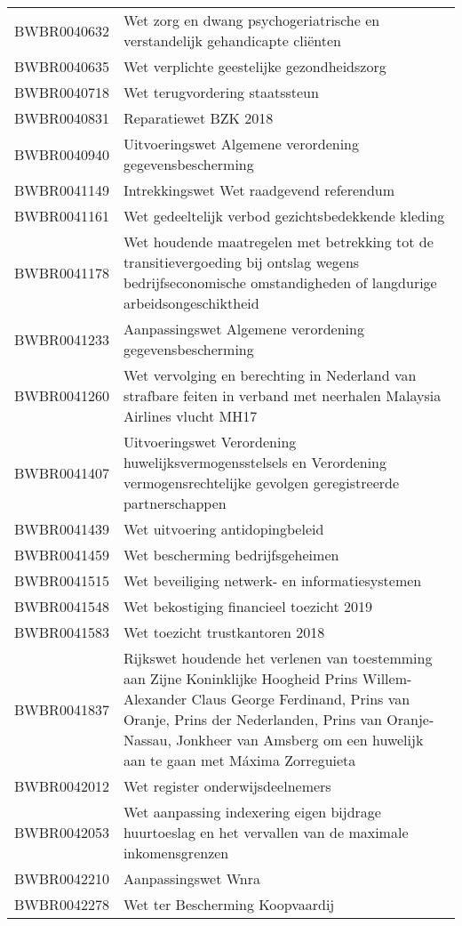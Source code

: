 \begin{longtable}{lp{}}
BWBR0040632 & Wet zorg en dwang psychogeriatrische en verstandelijk gehandicapte cliënten \\
BWBR0040635 & Wet verplichte geestelijke gezondheidszorg \\
BWBR0040718 & Wet terugvordering staatssteun \\
BWBR0040831 & Reparatiewet BZK 2018 \\
BWBR0040940 & Uitvoeringswet Algemene verordening gegevensbescherming \\
BWBR0041149 & Intrekkingswet Wet raadgevend referendum \\
BWBR0041161 & Wet gedeeltelijk verbod gezichtsbedekkende kleding \\
BWBR0041178 & Wet houdende maatregelen met betrekking tot de transitievergoeding bij ontslag wegens bedrijfseconomische omstandigheden of langdurige arbeidsongeschiktheid \\
BWBR0041233 & Aanpassingswet Algemene verordening gegevensbescherming \\
BWBR0041260 & Wet vervolging en berechting in Nederland van strafbare feiten in verband met neerhalen Malaysia Airlines vlucht MH17 \\
BWBR0041407 & Uitvoeringswet Verordening huwelijksvermogensstelsels en Verordening vermogensrechtelijke gevolgen geregistreerde partnerschappen \\
BWBR0041439 & Wet uitvoering antidopingbeleid \\
BWBR0041459 & Wet bescherming bedrijfsgeheimen \\
BWBR0041515 & Wet beveiliging netwerk- en informatiesystemen \\
BWBR0041548 & Wet bekostiging financieel toezicht 2019 \\
BWBR0041583 & Wet toezicht trustkantoren 2018 \\
BWBR0041837 & Rijkswet houdende het verlenen van toestemming aan Zijne Koninklijke Hoogheid Prins Willem-Alexander Claus George Ferdinand, Prins van Oranje, Prins der Nederlanden, Prins van Oranje-Nassau, Jonkheer van Amsberg om een huwelijk aan te gaan met Máxima Zorreguieta \\
BWBR0042012 & Wet register onderwijsdeelnemers \\
BWBR0042053 & Wet aanpassing indexering eigen bijdrage huurtoeslag en het vervallen van de maximale inkomensgrenzen \\
BWBR0042210 & Aanpassingswet Wnra \\
BWBR0042278 & Wet ter Bescherming Koopvaardij \\

\end{longtable}
